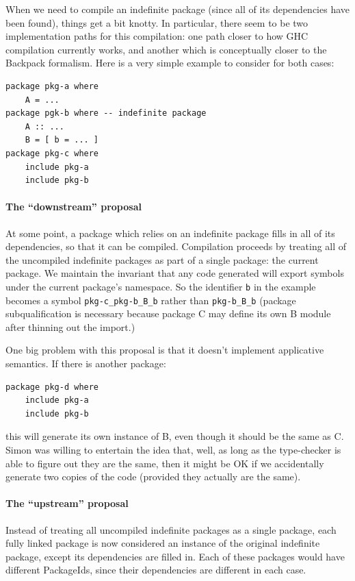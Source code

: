 \documentclass{article}
\begin{document}
When we need to compile an indefinite package (since all of its
dependencies have been found), things get a bit knotty.  In particular,
there seem to be two implementation paths for this compilation: one path
closer to how GHC compilation currently works, and another which is
conceptually closer to the Backpack formalism.  Here is a very simple
example to consider for both cases:

\begin{verbatim}
package pkg-a where
    A = ...
package pgk-b where -- indefinite package
    A :: ...
    B = [ b = ... ]
package pkg-c where
    include pkg-a
    include pkg-b
\end{verbatim}

\paragraph{The ``downstream'' proposal}  At some point, a package which
relies on an indefinite package fills in all of its dependencies, so
that it can be compiled.  Compilation proceeds by treating all of the
uncompiled indefinite packages as part of a single package: the current
package.  We maintain the invariant that any code generated will export
symbols under the current package's namespace.  So the identifier
\verb|b| in the example becomes a symbol \verb|pkg-c_pkg-b_B_b| rather
than \verb|pkg-b_B_b| (package subqualification is necessary because
package C may define its own B module after thinning out the import.)

One big problem with this proposal is that it doesn't implement applicative
semantics.  If there is another package:

\begin{verbatim}
package pkg-d where
    include pkg-a
    include pkg-b
\end{verbatim}

this will generate its own instance of B, even though it should be the same
as C.  Simon was willing to entertain the idea that, well, as long as the
type-checker is able to figure out they are the same, then it might be OK
if we accidentally generate two copies of the code (provided they actually
are the same).

\paragraph{The ``upstream'' proposal}  Instead of treating all
uncompiled indefinite packages as a single package, each fully linked
package is now considered an instance of the original indefinite
package, except its dependencies are filled in.  Each of these packages
would have different PackageIds, since their dependencies are different
in each case.
\end{document}
